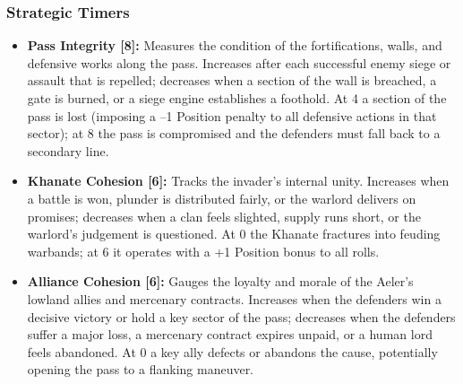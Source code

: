 \documentclass[11pt]{article}
\begin{document}
\subsubsection{Strategic Timers}
\begin{itemize}
\item \textbf{Pass Integrity [8]:} Measures the condition of the fortifications, walls, and defensive works along the pass. Increases after each successful enemy siege or assault that is repelled; decreases when a section of the wall is breached, a gate is burned, or a siege engine establishes a foothold. At 4 a section of the pass is lost (imposing a –1 Position penalty to all defensive actions in that sector); at 8 the pass is compromised and the defenders must fall back to a secondary line.
\item \textbf{Khanate Cohesion [6]:} Tracks the invader's internal unity. Increases when a battle is won, plunder is distributed fairly, or the warlord delivers on promises; decreases when a clan feels slighted, supply runs short, or the warlord's judgement is questioned. At 0 the Khanate fractures into feuding warbands; at 6 it operates with a +1 Position bonus to all rolls.
\item \textbf{Alliance Cohesion [6]:} Gauges the loyalty and morale of the Aeler's lowland allies and mercenary contracts. Increases when the defenders win a decisive victory or hold a key sector of the pass; decreases when the defenders suffer a major loss, a mercenary contract expires unpaid, or a human lord feels abandoned. At 0 a key ally defects or abandons the cause, potentially opening the pass to a flanking maneuver.
\end{itemize}
\end{document}
